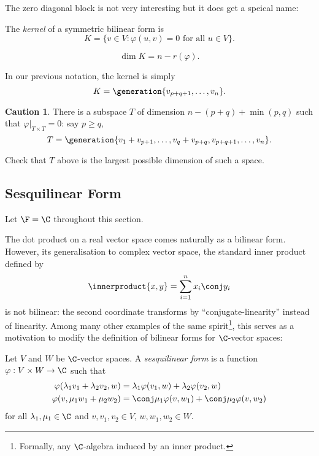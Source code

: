 \documentclass[a4paper]{article}
\newcommand*{\spans}{\generation}
\newcommand*{\ip}{\innerproduct}
\theoremstyle{definition}
\newtheorem*{caution}{Caution}
\begin{document}
The zero diagonal block is not very interesting but it does get a speical name:

\begin{definition}
  The \emph{kernel} of a symmetric bilinear form is
  \[
    K = \{ v \in V: \varphi(u, v) = 0 \text{ for all } u \in V\}.
  \]
\end{definition}

\begin{note}
  \[
    \dim K = n - r(\varphi).
  \]
\end{note}

In our previous notation, the kernel is simply
\[
  K = \spans{v_{p + q + 1}, \dots, v_n}.
\]

\begin{caution}
  There is a subspace \(T\) of dimension \(n - (p + q) + \min(p, q)\) such that \(\varphi|_{T \times T} = 0\): say \(p \geq q\),
  \[
    T = \spans{v_1 + v_{p + 1}, \dots, v_q + v_{p + q}, v_{p + q + 1}, \dots, v_n}.
  \]
\end{caution}

\begin{ex}
  Check that \(T\) above is the largest possible dimension of such a space.
\end{ex}

\subsection{Sesquilinear Form}

Let \(\F = \C\) throughout this section.

The dot product on a real vector space comes naturally as a bilinear form. However, its generalisation to complex vector space, the standard inner product defined by
\[
  \ip{x, y} = \sum_{i = 1}^{n} x_i \conj y_i
\]
is not bilinear: the second coordinate transforms by ``conjugate-linearity'' instead of linearity. Among many other examples of the same spirit\footnote{Formally, any \(\C\)-algebra induced by an inner product.}, this serves as a motivation to modify the definition of bilinear forms for \(\C\)-vector spaces:

\begin{definition}
  Let \(V\) and \(W\) be \(\C\)-vector spaces. A \emph{sesquilinear form} is a function \(\varphi: V \times W \to \C\) such that
  \begin{align*}
    \varphi(\lambda_1v_1 + \lambda_2v_2, w) &= \lambda_1 \varphi(v_1, w) + \lambda_2 \varphi(v_2, w) \\
    \varphi(v, \mu_1w_1 + \mu_2w_2) &= \conj \mu_1 \varphi(v, w_1) + \conj \mu_2 \varphi(v, w_2)
  \end{align*}
  for all \(\lambda_1, \mu_1 \in \C\) and \(v, v_1, v_2 \in V\), \(w, w_1, w_2 \in W\).
\end{definition}
\end{document}
